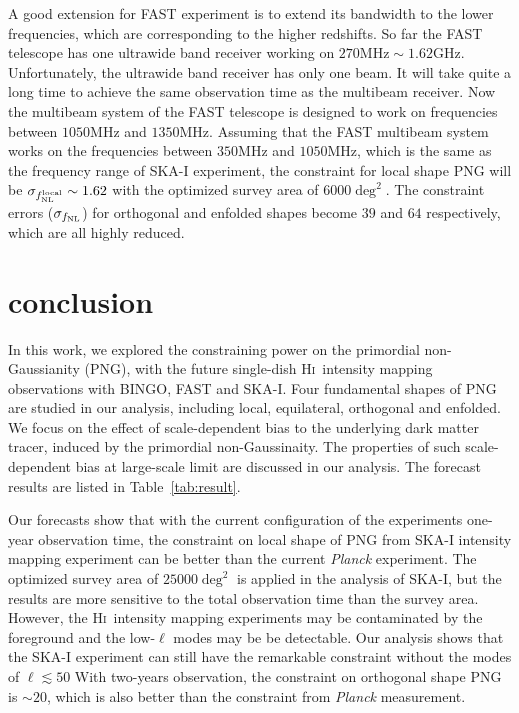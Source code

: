 \documentclass[twocolumn,floatfix,nofootinbib,aps,reprint]{revtex4}
\def\hi{\textsc{Hi~}}
\begin{document}
A good extension for FAST experiment is to extend its bandwidth 
to the lower frequencies, which are corresponding to the higher
redshifts.  
So far the FAST telescope has one ultrawide band receiver working on 
$270\mathrm{MHz}\sim1.62\mathrm{GHz}$. Unfortunately, the ultrawide
band receiver has only one beam. It will take quite a long time to achieve
the same observation time as the multibeam receiver.
Now the multibeam system of the FAST telescope is designed to
work on frequencies between $1050\mathrm{MHz}$ and $1350\mathrm{MHz}$.
Assuming that the FAST multibeam system works on the frequencies between 
$350\mathrm{MHz}$ and $1050\mathrm{MHz}$, which is the same as 
the frequency range of SKA-I experiment, the constraint for local shape 
PNG will be $\sigma_{f^{\rm local}_\mathrm{NL}}\sim1.62$ with the 
optimized survey area of $6000\deg^2$. The constraint errors ($\sigma_{f_{\rm NL}}$) for
orthogonal and enfolded shapes become $39$ and $64$ respectively, which are all highly reduced.

\section{conclusion}
In this work, we explored the constraining power on the 
primordial non-Gaussianity (PNG), with the future single-dish \hi intensity mapping 
observations with BINGO, FAST and SKA-I.
Four fundamental shapes of PNG are studied in our analysis, 
including local, equilateral, orthogonal and enfolded. 
We focus on the effect of scale-dependent bias to the underlying 
dark matter tracer, induced by the primordial non-Gaussinaity.
The properties of such scale-dependent bias at large-scale limit 
are discussed in our analysis.  
The forecast results are listed in Table~\ref{tab:result}.

Our forecasts show that with the current configuration of the experiments
one-year observation time, the constraint on local shape of PNG from SKA-I intensity mapping experiment can be 
better than the current {\it Planck} experiment.
The optimized survey area of $25000\deg^2$ is applied in the analysis of SKA-I,
but the results are more sensitive to the total observation time than 
the survey area. However, the \hi intensity mapping experiments may be
contaminated by the foreground and the low-$\ell$ modes may be be
detectable. Our analysis shows that the SKA-I experiment can still 
have the remarkable constraint without the modes of $\ell\lesssim50$
With two-years observation, the constraint on orthogonal shape
PNG is $\sim20$, which is also better than
the constraint from {\it Planck} measurement.
\end{document}
